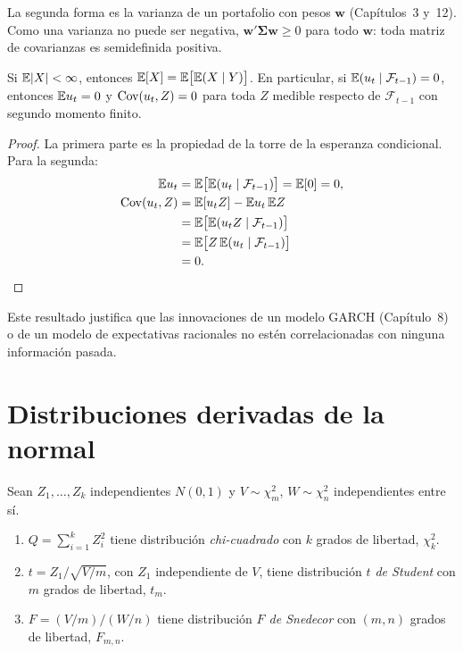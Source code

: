 La segunda forma es la varianza de un portafolio con pesos $\bm w$ (Capítulos~3 y~12). Como una varianza
no puede ser negativa, $\bm w'\bm\Sigma\bm w\ge0$ para todo $\bm w$: toda matriz de covarianzas es
semidefinida positiva.

\begin{proposicion}\label{prop:ap-iterada}
Si $\mathbb{E}|X|<\infty$, entonces $\mathbb{E}[X]=\mathbb{E}\bigl[\mathbb{E}(X\mid Y)\bigr]$. En particular, si $\mathbb{E}(u_t\mid
\mathcal F_{t-1})=0$, entonces $\mathbb{E} u_t=0$ y $\operatorname{Cov}(u_t,Z)=0$ para toda $Z$ medible respecto de
$\mathcal F_{t-1}$ con segundo momento finito.
\end{proposicion}

\begin{proof}
La primera parte es la propiedad de la torre de la esperanza condicional. Para la segunda:
\begin{align*}
  \mathbb{E} u_t     &= \mathbb{E}\bigl[\mathbb{E}(u_t\mid\mathcal F_{t-1})\bigr]=\mathbb{E}[0]=0,\\
  \operatorname{Cov}(u_t,Z)&= \mathbb{E}[u_tZ]-\mathbb{E} u_t\,\mathbb{E} Z\\
             &= \mathbb{E}\bigl[\mathbb{E}(u_tZ\mid\mathcal F_{t-1})\bigr]\\
             &= \mathbb{E}\bigl[Z\,\mathbb{E}(u_t\mid\mathcal F_{t-1})\bigr]\\
             &= 0. \qedhere
\end{align*}
\end{proof}

Este resultado justifica que las innovaciones de un modelo GARCH (Capítulo~8) o de un modelo de
expectativas racionales no estén correlacionadas con ninguna información pasada.

\section{Distribuciones derivadas de la normal}

\begin{definicion}
Sean $Z_1,\dots,Z_k$ independientes $N(0,1)$ y $V\sim\chi^2_m$, $W\sim\chi^2_n$ independientes entre sí.
\begin{enumerate}[label=(\roman*)]
  \item $Q=\sum_{i=1}^kZ_i^2$ tiene distribución \emph{chi-cuadrado} con $k$ grados de libertad, $\chi^2_k$.
  \item $t=Z_1/\sqrt{V/m}$, con $Z_1$ independiente de $V$, tiene distribución \emph{$t$ de Student} con $m$
        grados de libertad, $t_m$.
  \item $F=(V/m)/(W/n)$ tiene distribución \emph{$F$ de Snedecor} con $(m,n)$ grados de libertad, $F_{m,n}$.
\end{enumerate}
\end{definicion}

